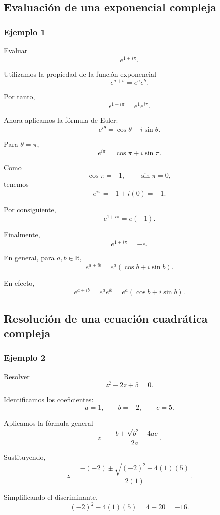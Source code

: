 \subsection{Evaluación de una exponencial compleja}

\subsubsection*{Ejemplo 1}

Evaluar
\[
e^{1+i\pi}.
\]

Utilizamos la propiedad de la función exponencial
\[
e^{a+b}=e^a e^b.
\]

Por tanto,
\[
e^{1+i\pi}
=
e^1e^{i\pi}.
\]

Ahora aplicamos la fórmula de Euler:
\[
e^{i\theta}
=
\cos\theta+i\sin\theta.
\]

Para $\theta=\pi$,
\[
e^{i\pi}
=
\cos\pi+i\sin\pi.
\]

Como
\[
\cos\pi=-1,
\qquad
\sin\pi=0,
\]
tenemos
\[
e^{i\pi}
=
-1+i(0)
=
-1.
\]

Por consiguiente,
\[
e^{1+i\pi}
=
e(-1).
\]

Finalmente,
\[
\boxed{
e^{1+i\pi}=-e
}.
\]

En general, para $a,b\in\mathbb{R}$,
\[
\boxed{
e^{a+ib}
=
e^a(\cos b+i\sin b)
}.
\]

En efecto,
\[
e^{a+ib}
=
e^a e^{ib}
=
e^a(\cos b+i\sin b).
\]

\subsection{Resolución de una ecuación cuadrática compleja}

\subsubsection*{Ejemplo 2}

Resolver
\[
z^2-2z+5=0.
\]

Identificamos los coeficientes:
\[
a=1,
\qquad
b=-2,
\qquad
c=5.
\]

Aplicamos la fórmula general
\[
z
=
\frac{-b\pm\sqrt{b^2-4ac}}{2a}.
\]

Sustituyendo,
\[
z
=
\frac{-(-2)\pm
\sqrt{(-2)^2-4(1)(5)}}{2(1)}.
\]

Simplificando el discriminante,
\[
(-2)^2-4(1)(5)
=
4-20
=
-16.
\]

